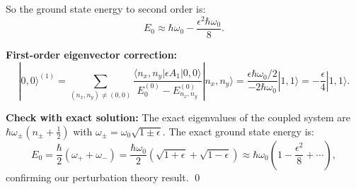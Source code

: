 \documentclass[12pt]{article}
\begin{document}
So the ground state energy to second order is:
\[
\boxed{E_0 \approx \hbar\omega_0 - \frac{\epsilon^2\hbar\omega_0}{8}}.
\]

\textbf{First-order eigenvector correction:}
\[
|0,0\rangle^{(1)} = \sum_{(n_x,n_y)\neq(0,0)} \frac{\langle n_x,n_y|\epsilon A_1|0,0\rangle}{E_0^{(0)} - E_{n_x,n_y}^{(0)}}|n_x,n_y\rangle = \frac{\epsilon\hbar\omega_0/2}{-2\hbar\omega_0}|1,1\rangle = -\frac{\epsilon}{4}|1,1\rangle.
\]

\textbf{Check with exact solution:} The exact eigenvalues of the coupled system are $\hbar\omega_\pm(n_\pm + \frac{1}{2})$ with $\omega_\pm = \omega_0\sqrt{1\pm\epsilon}$. The exact ground state energy is:
\[
E_0 = \frac{\hbar}{2}(\omega_+ + \omega_-) = \frac{\hbar\omega_0}{2}\left(\sqrt{1+\epsilon} + \sqrt{1-\epsilon}\right) \approx \hbar\omega_0\left(1 - \frac{\epsilon^2}{8} + \cdots\right),
\]
confirming our perturbation theory result. \qed
\end{document}
